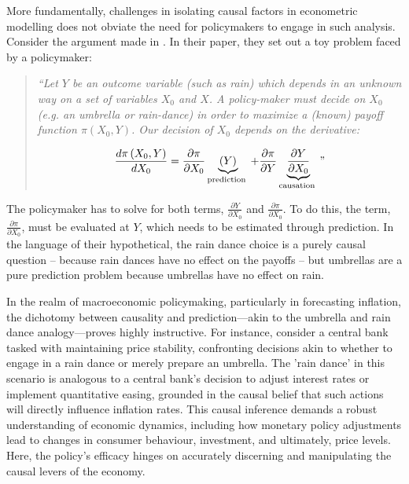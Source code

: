 More fundamentally, challenges in isolating causal factors in econometric modelling does not obviate the need for policymakers to engage in such analysis. Consider the argument made in \textcite{Kleinberg2015PredictionProblems}. In their paper, they set out a toy problem faced by a policymaker:

\begin{quote}
    \textit{``Let $Y$ be an outcome variable (such as rain) which depends in an unknown way on a set of variables $X_0$ and $X$. A policy-maker must decide on $X_0$ (e.g. an umbrella or rain-dance) in order to maximize a (known) payoff function $\pi\left(X_0, Y\right)$. Our decision of $X_0$ depends on the derivative:}

    $$
    \frac{d \pi\left(X_0, Y\right)}{d X_0}=\frac{\partial \pi}{\partial X_0} \underbrace{(Y)}_{\text {prediction }}+\frac{\partial \pi}{\partial Y} \underbrace{\frac{\partial Y}{\partial X_0}}_{\text {causation }}"
    $$
\end{quote}

The policymaker has to solve for both terms, $\frac{\partial Y}{\partial X_0}$ and $\frac{\partial \pi}{\partial X_0}$. To do this, the term, $\frac{\partial \pi}{\partial X_0}$, must be evaluated at $Y$, which needs to be estimated through prediction. In the language of their hypothetical, the rain dance choice is a purely causal question -- because rain dances have no effect on the payoffs -- but umbrellas are a pure prediction problem because umbrellas have no effect on rain. 

In the realm of macroeconomic policymaking, particularly in forecasting inflation, the dichotomy between causality and prediction—akin to the umbrella and rain dance analogy—proves highly instructive. For instance, consider a central bank tasked with maintaining price stability, confronting decisions akin to whether to engage in a rain dance or merely prepare an umbrella. The 'rain dance' in this scenario is analogous to a central bank's decision to adjust interest rates or implement quantitative easing, grounded in the causal belief that such actions will directly influence inflation rates. This causal inference demands a robust understanding of economic dynamics, including how monetary policy adjustments lead to changes in consumer behaviour, investment, and ultimately, price levels. Here, the policy's efficacy hinges on accurately discerning and manipulating the causal levers of the economy.

